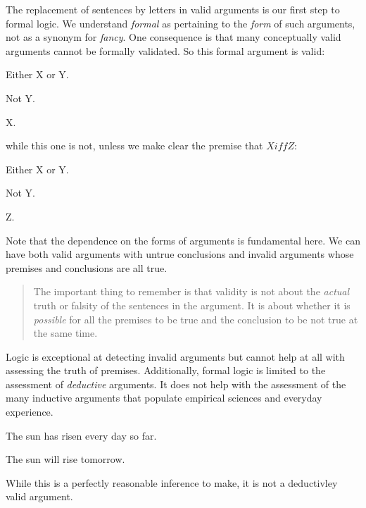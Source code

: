 The replacement of sentences by letters in valid arguments is our first step to
formal logic. We understand \textit{formal} as pertaining to the \textit{form} of
such arguments, not as a synonym for \textit{fancy}. One consequence is that many
conceptually valid arguments cannot be formally validated. So this formal argument
is valid:

\begin{argument}
\item[] Either X or Y.
\item[] Not Y.
\item[\therefore] X.
\end{argument}

while this one is not, unless we make clear the premise that $X iff Z$:

\begin{argument}
\item[] Either X or Y.
\item[] Not Y.
\item[\therefore] Z.
\end{argument}

Note that the dependence on the forms of arguments is fundamental here. We can have
both valid arguments with untrue conclusions and invalid arguments whose premises
and conclusions are all true.

\begin{quote}
  The important thing to remember is that validity is not about the \textit{actual}
  truth or falsity of the sentences in the argument. It is about whether it is
  \textit{possible} for all the premises to be true and the conclusion to be not
  true at the same time. \cite[][p15]{Mag25}
\end{quote}

Logic is exceptional at detecting invalid arguments but cannot help at all with
assessing the truth of premises. Additionally, formal logic is limited to the
assessment of \textit{deductive} arguments. It does not help with the assessment
of the many inductive arguments that populate empirical sciences and everyday
experience.

\begin{argument}
\item[] The sun has risen every day so far.
\item[\therefore] The sun will rise tomorrow.
\end{argument}

While this is a perfectly reasonable inference to make, it is not a deductivley
valid argument.

